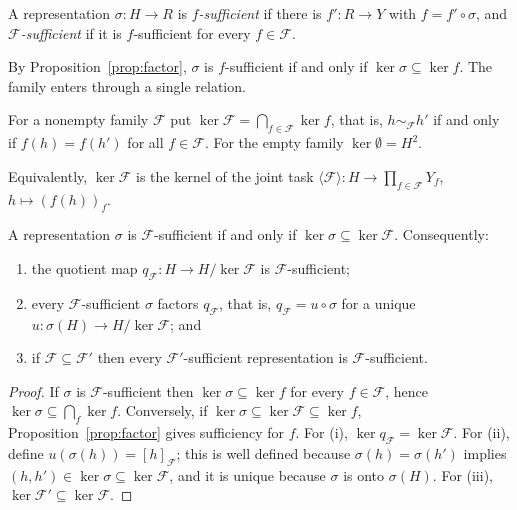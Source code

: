 \begin{definition}[Sufficiency]
\label{def:suff}
A representation $\sigma:H\to R$ is \emph{$f$-sufficient} if there is $f':R\to Y$ with $f=f'\circ\sigma$, and \emph{$\mathcal F$-sufficient} if it is $f$-sufficient for every $f\in\mathcal F$.
\end{definition}

By Proposition~\ref{prop:factor}, $\sigma$ is $f$-sufficient if and only if $\ker\sigma\subseteq\ker f$. The family enters through a single relation.

\begin{definition}
\label{def:famker}
For a nonempty family $\mathcal F$ put $\ker\mathcal F=\bigcap_{f\in\mathcal F}\ker f$, that is, $h\sim_{\mathcal F}h'$ if and only if $f(h)=f(h')$ for all $f\in\mathcal F$. For the empty family $\ker\emptyset=H^2$.
\end{definition}

Equivalently, $\ker\mathcal F$ is the kernel of the joint task $\langle\mathcal F\rangle:H\to\prod_{f\in\mathcal F}Y_f$, $h\mapsto(f(h))_f$.

\begin{theorem}
\label{thm:suff-refine}
A representation $\sigma$ is $\mathcal F$-sufficient if and only if $\ker\sigma\subseteq\ker\mathcal F$. Consequently:
\begin{enumerate}[label=(\roman*),nosep]
\item the quotient map $q_{\mathcal F}:H\to H/\ker\mathcal F$ is $\mathcal F$-sufficient;
\item every $\mathcal F$-sufficient $\sigma$ factors $q_{\mathcal F}$, that is, $q_{\mathcal F}=u\circ\sigma$ for a unique $u:\sigma(H)\to H/\ker\mathcal F$; and
\item if $\mathcal F\subseteq\mathcal F'$ then every $\mathcal F'$-sufficient representation is $\mathcal F$-sufficient.
\end{enumerate}
\end{theorem}

\begin{proof}
If $\sigma$ is $\mathcal F$-sufficient then $\ker\sigma\subseteq\ker f$ for every $f\in\mathcal F$, hence $\ker\sigma\subseteq\bigcap_f\ker f$. Conversely, if $\ker\sigma\subseteq\ker\mathcal F\subseteq\ker f$, Proposition~\ref{prop:factor} gives sufficiency for $f$. For (i), $\ker q_{\mathcal F}=\ker\mathcal F$. For (ii), define $u(\sigma(h))=[h]_{\mathcal F}$; this is well defined because $\sigma(h)=\sigma(h')$ implies $(h,h')\in\ker\sigma\subseteq\ker\mathcal F$, and it is unique because $\sigma$ is onto $\sigma(H)$. For (iii), $\ker\mathcal F'\subseteq\ker\mathcal F$.
\end{proof}

